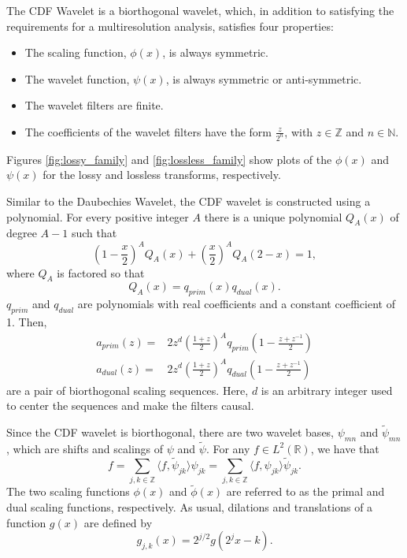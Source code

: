 \documentclass[titlepage,12pt]{article}
\begin{document}
The CDF Wavelet is a biorthogonal wavelet, which, in addition to satisfying the requirements for a multiresolution analysis,
satisfies four properties\cite{old}:
\begin{itemize}
	\item The scaling function, $\phi(x)$, is always symmetric.
	\item The wavelet function, $\psi(x)$, is always symmetric or anti-symmetric.
	\item The wavelet filters are finite.
	\item The coefficients of the wavelet filters have the form $\frac{z}{2^n}$, with $z\in\mathbb{Z}$ and $n\in\mathbb{N}$.
\end{itemize}
Figures \ref{fig:lossy_family} and \ref{fig:lossless_family} show plots of the $\phi(x)$
and $\psi(x)$ for the lossy and lossless transforms, respectively.

Similar to the Daubechies Wavelet, the CDF wavelet is constructed using a polynomial.
For every positive integer $A$ there is a unique polynomial $Q_A(x)$ of degree $A-1$ such that
\[(1-\frac{x}{2})^AQ_A(x)+(\frac{x}{2})^AQ_A(2-x)=1,\]
where $Q_A$ is factored so that
\[Q_A(x)=q_{prim}(x)q_{dual}(x).\]
$q_{prim}$ and $q_{dual}$ are polynomials with real coefficients and a constant coefficient of 1.
Then,
\begin{align*}
	a_{prim}(z) =& 2z^d(\frac{1+z}{2})^Aq_{prim}(1-\frac{z+z^{-1}}{2}) \\
	a_{dual}(z) =& 2z^d(\frac{1+z}{2})^Aq_{dual}(1-\frac{z+z^{-1}}{2})
\end{align*}
are a pair of biorthogonal scaling sequences.
Here, $d$ is an arbitrary integer used to center the sequences and make the filters causal.

Since the CDF wavelet is biorthogonal, there are two wavelet bases, $\psi_{mn}$ and $\tilde{\psi}_{mn}$,
which are shifts and scalings of $\psi$ and $\tilde{\psi}$.\cite{cdf}
For any $f\in L^2(\mathbb{R})$, we have that
\begin{equation}
	f = \sum_{j,k\in\mathbb{Z}}\langle f,\tilde{\psi}_{jk}\rangle\psi_{jk}=\sum_{j,k\in\mathbb{Z}}\langle f,\psi_{jk}\rangle\tilde{\psi}_{jk}.
\end{equation}
The two scaling functions $\phi(x)$ and $\tilde{\phi}(x)$ are referred to 
as the primal and dual scaling functions, respectively.\cite{cdfwhat}
As usual, dilations and translations of a function $g(x)$ are defined by 
\[g_{j,k}(x)=2^{j/2}g(2^jx-k).\]

\end{document}
